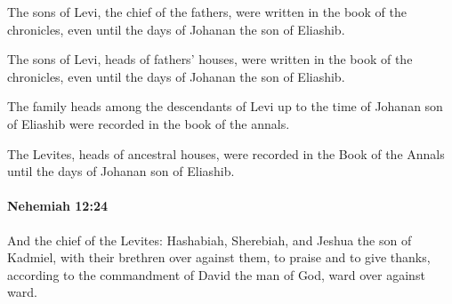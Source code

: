 			The sons of Levi, the chief of the fathers, were written in the book of the chronicles, even until the days of Johanan the son of Eliashib.

			\begin{versebox}
					\item[BHS] 
					\item[LXX] 
					\item[ASV] The sons of Levi, heads of fathers' houses, were written in the book of the chronicles, even until the days of Johanan the son of Eliashib.
					\item[NIV] The family heads among the descendants of Levi up to the time of Johanan son of Eliashib were recorded in the book of the annals.
					\item[NRSV] The Levites, heads of ancestral houses, were recorded in the Book of the Annals until the days of Johanan son of Eliashib.
			\end{versebox}

		\paragraph{Nehemiah 12:24} %
			\label{NEHEMIAH-12-24}

			And the chief of the Levites: Hashabiah, Sherebiah, and Jeshua the son of Kadmiel, with their brethren over against them, to praise and to give thanks, according to the commandment of David the man of God, ward over against ward.

